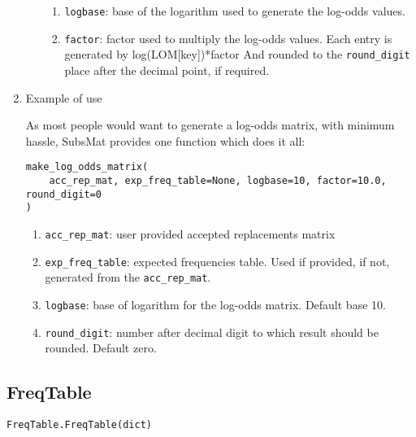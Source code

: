 \begin{enumerate}
\begin{enumerate}
\begin{enumerate}
     \item \verb|logbase|: base of the logarithm used to generate the log-odds values.

     \item \verb|factor|: factor used to multiply the log-odds values.  Each entry is generated by log(LOM[key])*factor And rounded to the \verb|round_digit| place after the decimal point, if required.

\end{enumerate}

\end{enumerate}

\item Example of use

As most people would want to generate a log-odds matrix, with minimum hassle, SubsMat provides one function which does it all:

\begin{verbatim}
make_log_odds_matrix(
    acc_rep_mat, exp_freq_table=None, logbase=10, factor=10.0, round_digit=0
)
\end{verbatim}

\begin{enumerate}
  \item \verb|acc_rep_mat|: user provided accepted replacements matrix
  \item \verb|exp_freq_table|: expected frequencies table. Used if provided, if not, generated from the \verb|acc_rep_mat|.
  \item \verb|logbase|: base of logarithm for the log-odds matrix. Default base 10.
  \item \verb|round_digit|: number after decimal digit to which result should be rounded. Default zero.
\end{enumerate}

\end{enumerate}

\subsection{FreqTable}
\label{sec:freq_table}

\begin{verbatim}
FreqTable.FreqTable(dict)
\end{verbatim}

